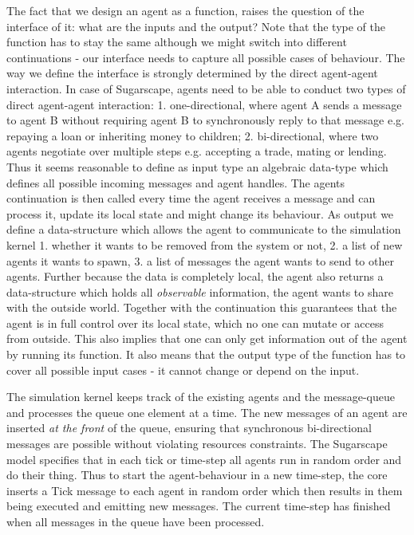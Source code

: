 The fact that we design an agent as a function, raises the question of the interface of it: what are the inputs and the output? Note that the type of the function has to stay the same although we might switch into different continuations - our interface needs to capture all possible cases of behaviour. The way we define the interface is strongly determined by the direct agent-agent interaction. In case of Sugarscape, agents need to be able to conduct two types of direct agent-agent interaction: 1. one-directional, where agent A sends a message to agent B without requiring agent B to synchronously reply to that message e.g. repaying a loan or inheriting money to children; 2. bi-directional, where two agents negotiate over multiple steps e.g. accepting a trade, mating or lending.
Thus it seems reasonable to define as input type an algebraic data-type which defines all possible incoming messages and agent handles. The agents continuation is then called every time the agent receives a message and can process it, update its local state and might change its behaviour.
As output we define a data-structure which allows the agent to communicate to the simulation kernel 1. whether it wants to be removed from the system or not, 2. a list of new agents it wants to spawn, 3. a list of messages the agent wants to send to other agents. Further because the data is completely local, the agent also returns a data-structure which holds all \textit{observable} information, the agent wants to share with the outside world. Together with the continuation this guarantees that the agent is in full control over its local state, which no one can mutate or access from outside. This also implies that one can only get information out of the agent by running its function. It also means that the output type of the function has to cover all possible input cases - it cannot change or depend on the input. 

The simulation kernel keeps track of the existing agents and the message-queue and processes the queue one element at a time. The new messages of an agent are inserted \textit{at the front} of the queue, ensuring that synchronous bi-directional messages are possible without violating resources constraints. The Sugarscape model specifies that in each tick or time-step all agents run in random order and do their thing. Thus to start the agent-behaviour in a new time-step, the core inserts a Tick message to each agent in random order which then results in them being executed and emitting new messages. The current time-step has finished when all messages in the queue have been processed.

